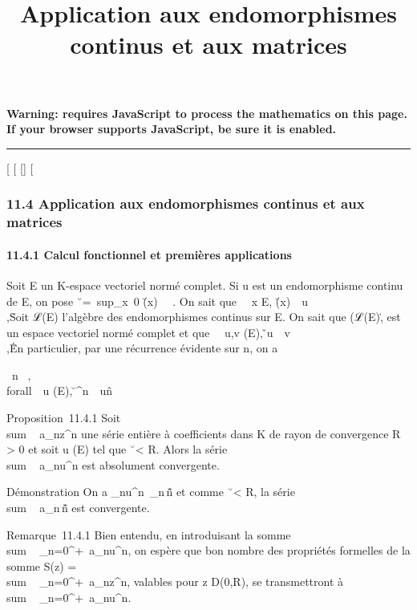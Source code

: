 \documentclass[]{article}
\title{Application aux endomorphismes continus et aux matrices}
\author{}
\date{}
\begin{document}
\maketitle

\textbf{Warning: 
requires JavaScript to process the mathematics on this page.\\ If your
browser supports JavaScript, be sure it is enabled.}

\begin{center}\rule{3in}{0.4pt}\end{center}

[
[
[]
[

\subsubsection{11.4 Application aux endomorphismes continus et aux
matrices}

\paragraph{11.4.1 Calcul fonctionnel et premières applications}

Soit E un K-espace vectoriel normé complet. Si u est un endomorphisme
continu de E, on pose
\u\
=\
sup_x\neq~0
\u(x)\
\over
\x\ . On sait que
\forall~~x \in E,
\u(x)\
\leq\
u\\,\x\.
Soit ℒ(E) l'algèbre des endomorphismes continus sur E. On sait que
(ℒ(E),\.\) est un
espace vectoriel normé complet et que \forall~~u,v
\inℒ(E), \v \cdot u\
\leq\
v\\,\u\.
En particulier, par une récurrence évidente sur n, on a

\forall~n \in {}~, \\forall~~u (E),
\u^n\
\leq\ u\^n

Proposition~11.4.1 Soit
\\sum ~
a_nz^n une série entière à coefficients dans K de
rayon de convergence R > 0 et soit u (E) tel que
\u\ < R.
Alors la série \\sum ~
a_nu^n est absolument convergente.

Démonstration On a
\a_nu^n\
\leqa_n\,\u\^n
et comme \u\
< R, la série
\\sum ~
a_n\,\u\^n
est convergente.

Remarque~11.4.1 Bien entendu, en introduisant la somme
\\sum ~
_n=0^+\infty~a_nu^n, on espère que bon
nombre des propriétés formelles de la somme S(z)
= \\sum ~
_n=0^+\infty~a_nz^n, valables pour z \in
D(0,R), se transmettront à
\\sum ~
_n=0^+\infty~a_nu^n.
\end{document}
